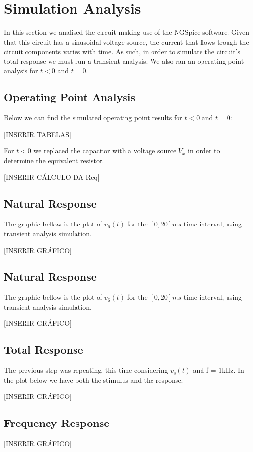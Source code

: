 \section{Simulation Analysis}
\label{sec:simulation}

\paragraph{} In this section we analised the circuit making use of the NGSpice software. Given that this circuit has a sinusoidal voltage source, the current that flows trough the circuit components varies with time.
As such, in order to simulate the circuit's total response we must run a transient analysis. We also ran an operating point analysis for $t < 0$ and $t = 0$.

\subsection{Operating Point Analysis}

Below we can find the simulated operating point results for  $t < 0$ and $t = 0$:

[INSERIR TABELAS]

For $t<0$ we replaced the capacitor with a voltage source $V_x$ in order to determine the equivalent resistor.

[INSERIR CÁLCULO DA Req]

\subsection{Natural Response}

The graphic bellow is the plot of $v_6(t)$ for the $[0, 20]ms$ time interval, using transient analysis simulation.

[INSERIR GRÁFICO]

\subsection{Natural Response}

The graphic bellow is the plot of $v_6(t)$ for the $[0, 20]ms$ time interval, using transient analysis simulation.

[INSERIR GRÁFICO]

\subsection{Total Response}

The previous step was repeating, this time considering $v_s(t)$ and f = 1kHz. In the plot below we have both the stimulus and the response.

[INSERIR GRÁFICO]

\subsection{Frequency Response}



[INSERIR GRÁFICO]
